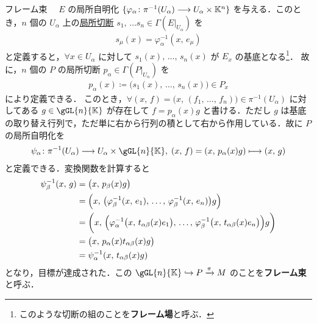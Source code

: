 \documentclass[TQFT_main]{subfiles}
\begin{document}
\begin{myexample}[label=def:framebundle]{フレーム束}
    　$E$ の局所自明化 $\{\varphi_\alpha \colon \pi^{-1}(U_\alpha) \longrightarrow U_\alpha \times \mathbb{K}^n \}$ を与える．このとき，$n$ 個の $U_\alpha$ 上の\hyperref[def.section]{局所切断} $s_1,\, \dots s_n \in \Gamma(E|_{U_\alpha})$ を
    \begin{align}
        s_\mu(x) = \varphi_\alpha^{-1} (x,\, e_\mu)
    \end{align}
    と定義すると，$\forall x \in U_\alpha$ に対して $s_1(x),\, \dots ,\, s_n(x)$ が $E_x$ の基底となる\footnote{このような切断の組のことを\textbf{フレーム場}と呼ぶ．}．
    故に，$n$ 個の $P$ の局所切断 $p_\alpha \in \Gamma(P|_{U_\alpha})$ を
    \begin{align}
        p_\alpha (x) \coloneqq \bigl( s_1(x),\, \dots,\, s_n(x) \bigr) \in P_x
    \end{align}
    により定義できる．
    このとき，$\forall (x,\, f) = \bigl(x,\, (f_1,\, \dots,\, f_n)\bigr) \in \pi^{-1}(U_\alpha)$ に対してある $g \in \gGL{n}{\mathbb{K}}$ が存在して $f = p_\alpha(x) g$ と書ける．ただし $g$ は基底の取り替え行列で，ただ単に右から行列の積として右から作用している．故に $P$ の局所自明化を
    \begin{align}
        \psi_\alpha \colon \pi^{-1}(U_\alpha) \lto U_\alpha \times \gGL{n}{\mathbb{K}},\; (x,\, f) = (x,\, p_\alpha (x) g)\lmto (x,\, g)
    \end{align}
    と定義できる．変換関数を計算すると
    \begin{align}
        \psi_\beta^{-1}(x,\, g) 
        &= \bigl(x,\, p_\beta (x) g\bigr) \\
        &= \Bigl(x,\, \bigl(\varphi_\beta^{-1}(x,\, e_1),\, \dots,\, \varphi_\beta^{-1}(x,\, e_n)\bigr) g\Bigr) \\
        &= \biggl(x,\, \Bigl(\varphi_\alpha^{-1}\bigl(x,\, t_{\alpha\beta}(x) e_1\bigr),\, \dots,\, \varphi_\beta^{-1}\bigl(x,\, t_{\alpha\beta}(x) e_n\bigr)\Bigr) g\biggr) \\
        &= \bigl(x,\, p_{\alpha} (x) t_{\alpha\beta}(x) g\bigr) \\
        &= \psi_\alpha^{-1} (x,\, t_{\alpha\beta}(x) g)
    \end{align}
    となり，目標が達成された．この $\gGL{n}{\mathbb{K}} \hookrightarrow P \xrightarrow{\pi} M$ のことを\textbf{フレーム束}と呼ぶ．
\end{myexample}
\end{document}
